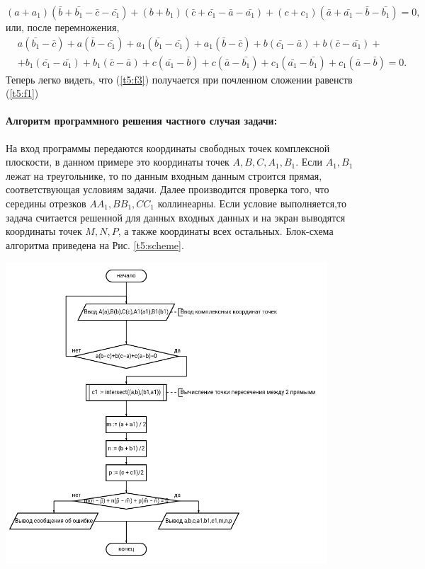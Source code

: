 {    \(
    (a+a_1)(\bar{b}+\bar{b_1}-\bar{c}-\bar{c_1})+(b+b_1 )(\bar{c}+\bar{c_1}-\bar{a}-\bar{a_1})+(c+c_1)(\bar{a}+\bar{a_1}-\bar{b}-\bar{b_1})=0,
    \) или, после перемножения,
    \begin{equation}
        \begin{aligned}
             & a(\bar{b_1} - \bar{c}) + a(\bar{b}- \bar{c_1}) + a_1(\bar{b_1} - \bar{c_1}) + a_1(\bar{b}- \bar{c}) + b(\bar{c_1} - \bar{a}) + b(\bar{c}- \bar{a_1}) + \\
             & +b_1(\bar{c_1}-\bar{a_1})+b_1 (\bar{c}-\bar{a})+c(\bar{a_1}-\bar{b})+c(\bar{a}-\bar{b_1})+c_1 (\bar{a_1}-\bar{b_1} )+c_1(\bar{a}-\bar{b})=0.
        \end{aligned}
        \label{t5:f3}
    \end{equation}
    Теперь легко видеть, что (\ref{t5:f3}) получается при почленном сложении
    равенств (\ref{t5:f1})
    \paragraph{Алгоритм программного решения частного случая задачи:} На вход программы передаются координаты свободных точек комплексной плоскости, в данном примере это координаты точек \(A,B,C,A_1,B_1\). Если \(A_1,B_1\) лежат на треугольнике, то по данным входным данным строится прямая, соответствующая условиям задачи. Далее производится проверка того, что середины отрезков \(AA_1,BB_1,CC_1\) коллинеарны. Если условие выполняется,то задача считается решенной для данных входных данных и на экран выводятся координаты точек \(M,N,P\), а также координаты всех остальных. Блок-схема алгоритма приведена на Рис. \ref{t5:scheme}.
    \begin{center}
        \includegraphics[width=0.9\textwidth]{images/diagram-1.png}
        \label{t5:scheme}
    \end{center}

}
